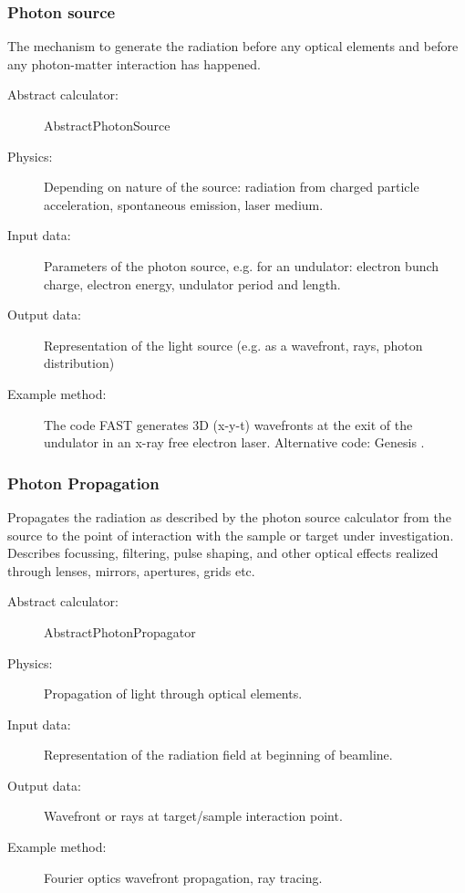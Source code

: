 \documentclass[a4paper]{article}
\begin{document}
\subsubsection{Photon source}
The mechanism to generate the radiation before any optical elements and before any photon-matter interaction has happened.
\begin{description}
  \item[Abstract calculator:] AbstractPhotonSource
  \item[Physics:] Depending on nature of the source: radiation from charged particle acceleration, spontaneous emission, laser medium.
  \item[Input data:] Parameters of the photon source, e.g. for an undulator: electron bunch charge, electron energy, undulator period and length.
  \item[Output data:] Representation of the light source (e.g. as a wavefront, rays, photon distribution)
  \item[Example method:] The code FAST \cite{Saldin1999} generates 3D (x-y-t) wavefronts at the exit of the undulator in an
    x-ray free electron laser. Alternative code: Genesis \cite{genesis_code_www}.
\end{description}
%
\subsubsection{Photon Propagation}
Propagates the radiation as described by the photon source calculator from the source to the point of interaction with the sample or target under
    investigation. Describes focussing, filtering, pulse shaping,
    and other optical effects realized through lenses, mirrors, apertures, grids etc.
\begin{description}
  \item[Abstract calculator:] AbstractPhotonPropagator
  \item[Physics:] Propagation of light through optical elements.
  \item[Input data:] Representation of the radiation field at beginning of beamline.
  \item[Output data:] Wavefront or rays at target/sample interaction point.
  \item[Example method:] Fourier optics wavefront propagation, ray tracing.
\end{description}
%
\end{document}
